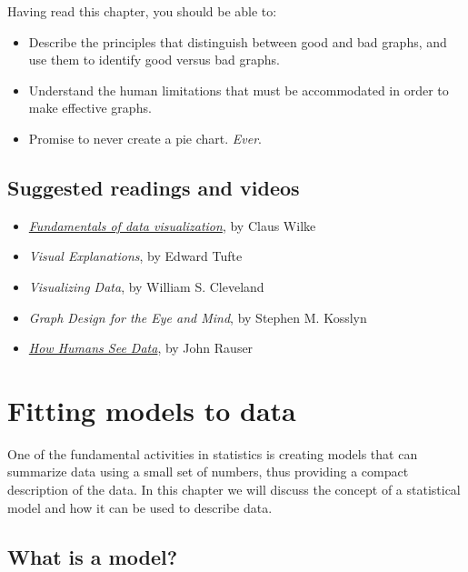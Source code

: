 \documentclass[12pt,]{book}
\providecommand{\tightlist}{%
  \setlength{\itemsep}{0pt}\setlength{\parskip}{0pt}}
\theoremstyle{definition}
\theoremstyle{definition}
\theoremstyle{definition}
\theoremstyle{remark}
\begin{document}
Having read this chapter, you should be able to:

\begin{itemize}
\tightlist
\item
  Describe the principles that distinguish between good and bad graphs, and use them to identify good versus bad graphs.
\item
  Understand the human limitations that must be accommodated in order to make effective graphs.
\item
  Promise to never create a pie chart. \emph{Ever}.
\end{itemize}

\hypertarget{suggested-readings-and-videos}{%
\section{Suggested readings and videos}\label{suggested-readings-and-videos}}

\begin{itemize}
\tightlist
\item
  \href{https://serialmentor.com/dataviz/}{\emph{Fundamentals of data visualization}}, by Claus Wilke
\item
  \emph{Visual Explanations}, by Edward Tufte
\item
  \emph{Visualizing Data}, by William S. Cleveland
\item
  \emph{Graph Design for the Eye and Mind}, by Stephen M. Kosslyn
\item
  \href{https://www.youtube.com/watch?v=fSgEeI2Xpdc\&feature=youtu.be}{\emph{How Humans See Data}}, by John Rauser
\end{itemize}

\hypertarget{fitting-models}{%
\chapter{Fitting models to data}\label{fitting-models}}

One of the fundamental activities in statistics is creating models that can summarize data using a small set of numbers, thus providing a compact description of the data. In this chapter we will discuss the concept of a statistical model and how it can be used to describe data.

\hypertarget{what-is-a-model}{%
\section{What is a model?}\label{what-is-a-model}}
\end{document}
